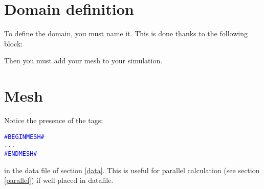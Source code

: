 \section{Domain definition}
To define the domain, you must name it. This is done thanks to the following block:

    \begin{center}
    \end{center}

Then you must add your mesh to your simulation.




\section{Mesh} \label{Mesh}

Notice the presence of the tags:
\begin{alltt} 
\textcolor{blue}{\# BEGIN MESH \#}
...
\textcolor{blue}{\# END MESH \#}
\end{alltt}
in the data file of section \ref{data}.
This is useful for parallel calculation (see section \ref{parallel}) if well placed in datafile.

